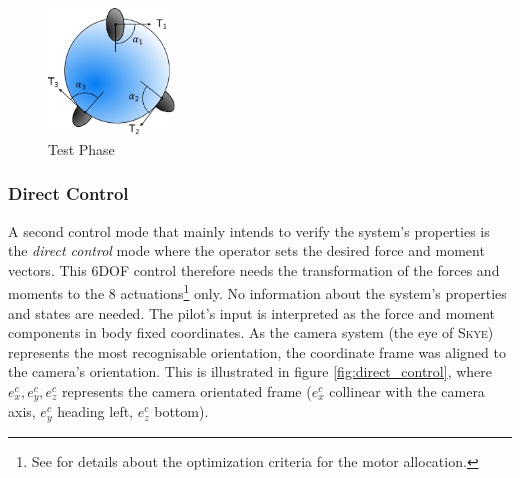 \begin{figure}[H] %
	\begin{center}
		\includegraphics[width=0.3\textwidth]{TPC.pdf}
		\caption[Test Phase]{Test Phase}  
		\label{fig:test_phase}		
	\end{center}
\end{figure}


\subsubsection{Direct Control} 
A second control mode that mainly intends to verify the system's properties is the \textit{direct control} mode where the operator sets the desired force and moment vectors. This 6DOF control therefore needs the transformation of the forces and moments to the 8 actuations\footnote{See \cite{schaffnervu} for details about the optimization criteria for the motor allocation.} only. No information about the system's properties and states are needed. The pilot's input is interpreted as the force and moment components in body fixed coordinates. As the camera system (the eye of \textsc{Skye}) represents the most recognisable orientation, the coordinate frame was aligned to the camera's orientation. This is illustrated in figure \ref{fig:direct_control}, where ${e_x^c, e_y^c, e_z^c}$ represents the camera orientated frame ($e_x^c$ collinear with the camera axis, $e_y^c$ heading left, $e_z^c$ bottom).


